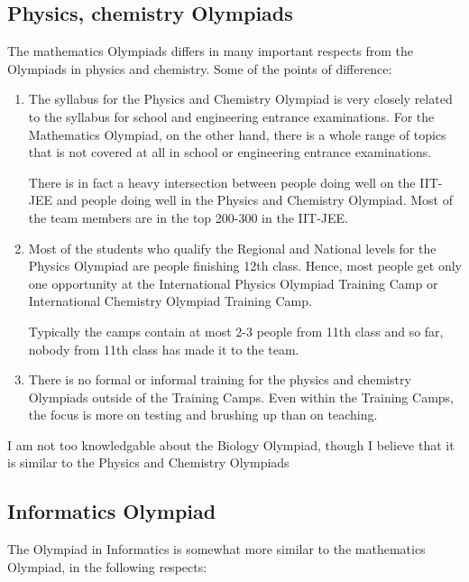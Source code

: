\documentclass[a4paper]{amsart}
\begin{document}
\subsection{Physics, chemistry Olympiads}

The mathematics Olympiads differs in many important respects from the
Olympiads in physics and chemistry. Some of the points of difference:

\begin{enumerate}

\item The syllabus for the Physics and Chemistry Olympiad is very
  closely related to the syllabus for school and engineering entrance
  examinations. For the Mathematics Olympiad, on the other hand, there
  is a whole range of topics that is not covered at all in school
  or engineering entrance examinations.

  There is in fact a heavy intersection between people doing well
  on the IIT-JEE and people doing well in the Physics and Chemistry Olympiad.
  Most of the team members are in the top 200-300 in the IIT-JEE.

\item Most of the students who qualify the Regional and National
  levels for the Physics Olympiad are people finishing 12th class.
  Hence, most people get only one opportunity at the International
  Physics Olympiad Training Camp or International Chemistry Olympiad
  Training Camp.

  Typically the camps contain at most 2-3 people from 11th class
  and so far, nobody from 11th class has made it to the team.

\item There is no formal or informal training for the physics and chemistry
  Olympiads outside of the Training Camps. Even within the Training Camps,
  the focus is more on testing and brushing up than on teaching.

\end{enumerate}

I am not too knowledgable about the Biology Olympiad, though I believe
that it is similar to the Physics and Chemistry Olympiads

\subsection{Informatics Olympiad}

The Olympiad in Informatics is somewhat more similar to the mathematics
Olympiad, in the following respects:
\end{document}
